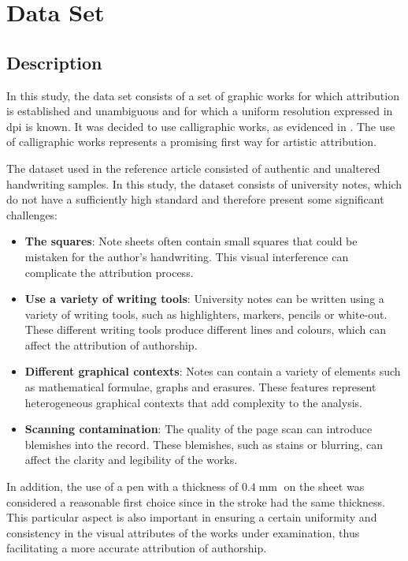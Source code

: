 \section{Data Set}
\subsection{Description}
In this study, the data set consists of a set of graphic works for which attribution is established and unambiguous and for which a uniform resolution expressed in \gls{dpi} is known. It was decided to use calligraphic works, as evidenced in \cite{thesis}. The use of calligraphic works represents a promising first way for artistic attribution.

\noindent The dataset used in the reference article consisted of authentic and unaltered handwriting samples. In this study, the dataset consists of university notes, which do not have a sufficiently high standard and therefore present some significant challenges:

\begin{itemize}
\item \textbf{The squares}: Note sheets often contain small squares that could be mistaken for the author's handwriting. This visual interference can complicate the attribution process.
\item \textbf{Use a variety of writing tools}: University notes can be written using a variety of writing tools, such as highlighters, markers, pencils or white-out. These different writing tools produce different lines and colours, which can affect the attribution of authorship.
\item \textbf{Different graphical contexts}: Notes can contain a variety of elements such as mathematical formulae, graphs and erasures. These features represent heterogeneous graphical contexts that add complexity to the analysis.
\item \textbf{Scanning contamination}: The quality of the page scan can introduce blemishes into the record. These blemishes, such as stains or blurring, can affect the clarity and legibility of the works.
\end{itemize}

\noindent In addition, the use of a pen with a thickness of $0.4\operatorname{\mathrm{mm}}$ on the sheet was considered a reasonable first choice since in \cite{thesis} the stroke had the same thickness. This particular aspect is also important in ensuring a certain uniformity and consistency in the visual attributes of the works under examination, thus facilitating a more accurate attribution of authorship.

